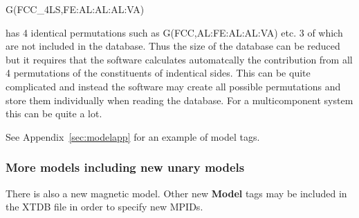 \documentclass{article}
\begin{document}
G(FCC\_4LS,FE:AL:AL:AL:VA)

\noindent
has 4 identical permutations such as G(FCC,AL:FE:AL:AL:VA) etc. 3 of
which are not included in the database.  Thus the size of the database
can be reduced but it requires that the software calculates
automatcally the contribution from all 4 permutations of the
constituents of indentical sides.  This can be quite complicated and
instead the software may create all possible permutations and store
them individually when reading the database.  For a multicomponent
system this can be quite a lot.

See Appendix~\ref{sec:modelapp} for an example of model tags.

\newpage 

\subsubsection{More models including new unary models}

There is also a new magnetic model.  Other new {\bf Model} tags
may be included in the XTDB file in order to specify new MPIDs.
\end{document}
